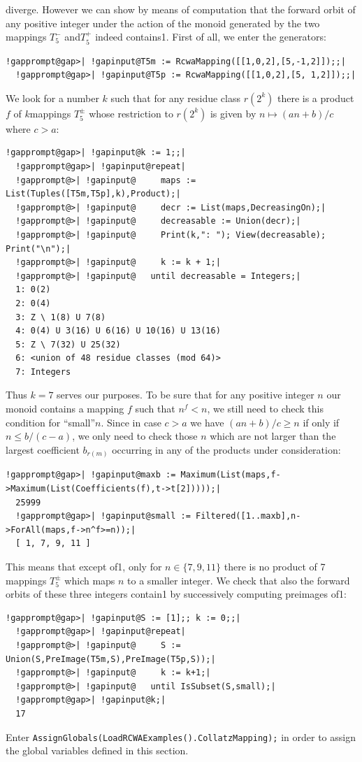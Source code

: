 \documentclass[a4paper,11pt]{report}
\begin{document}
{{   diverge. However we can show by means of computation that the forward orbit of
any positive integer under the action of the monoid generated by the two
mappings $T_5^-$ and{\nobreakspace}$T_5^+$ indeed contains{\nobreakspace}1. First of all, we enter the generators: 
\begin{Verbatim}[commandchars=!@|,fontsize=\small,frame=single,label=Example]
  !gapprompt@gap>| !gapinput@T5m := RcwaMapping([[1,0,2],[5,-1,2]]);;|
  !gapprompt@gap>| !gapinput@T5p := RcwaMapping([[1,0,2],[5, 1,2]]);;|
\end{Verbatim}
 We look for a number $k$ such that for any residue class $r(2^k)$ there is a product{\nobreakspace}$f$ of $k${\nobreakspace}mappings $T_5^\pm$ whose restriction to $r(2^k)$ is given by $n \mapsto (an+b)/c$ where $c>a$: 
\begin{Verbatim}[commandchars=!@|,fontsize=\small,frame=single,label=Example]
  !gapprompt@gap>| !gapinput@k := 1;;|
  !gapprompt@gap>| !gapinput@repeat|
  !gapprompt@>| !gapinput@     maps := List(Tuples([T5m,T5p],k),Product);|
  !gapprompt@>| !gapinput@     decr := List(maps,DecreasingOn);|
  !gapprompt@>| !gapinput@     decreasable := Union(decr);|
  !gapprompt@>| !gapinput@     Print(k,": "); View(decreasable); Print("\n");|
  !gapprompt@>| !gapinput@     k := k + 1;|
  !gapprompt@>| !gapinput@   until decreasable = Integers;|
  1: 0(2)
  2: 0(4)
  3: Z \ 1(8) U 7(8)
  4: 0(4) U 3(16) U 6(16) U 10(16) U 13(16)
  5: Z \ 7(32) U 25(32)
  6: <union of 48 residue classes (mod 64)>
  7: Integers
\end{Verbatim}
 Thus $k=7$ serves our purposes. To be sure that for any positive integer $n$ our monoid contains a mapping $f$ such that $n^f<n$, we still need to check this condition for ``small''{\nobreakspace}$n$. Since in case $c>a$ we have $(an+b)/c \geq n$ if only if $n \leq b/(c-a)$, we only need to check those $n$ which are not larger than the largest coefficient $b_{r(m)}$ occurring in any of the products under consideration: 
\begin{Verbatim}[commandchars=!@|,fontsize=\small,frame=single,label=Example]
  !gapprompt@gap>| !gapinput@maxb := Maximum(List(maps,f->Maximum(List(Coefficients(f),t->t[2]))));|
  25999
  !gapprompt@gap>| !gapinput@small := Filtered([1..maxb],n->ForAll(maps,f->n^f>=n));|
  [ 1, 7, 9, 11 ]
\end{Verbatim}
 This means that except of{\nobreakspace}1, only for $n \in \{{7,9,11\}}$ there is no product of 7 mappings $T_5^\pm$ which maps $n$ to a smaller integer. We check that also the forward orbits of these three
integers contain{\nobreakspace}1 by successively computing preimages
of{\nobreakspace}1: 
\begin{Verbatim}[commandchars=!@|,fontsize=\small,frame=single,label=Example]
  !gapprompt@gap>| !gapinput@S := [1];; k := 0;;|
  !gapprompt@gap>| !gapinput@repeat|
  !gapprompt@>| !gapinput@     S := Union(S,PreImage(T5m,S),PreImage(T5p,S));|
  !gapprompt@>| !gapinput@     k := k+1;|
  !gapprompt@>| !gapinput@   until IsSubset(S,small);|
  !gapprompt@gap>| !gapinput@k;|
  17
\end{Verbatim}
 Enter \texttt{AssignGlobals(LoadRCWAExamples().CollatzMapping);} in order to assign the global variables defined in this section. }

}
\end{document}
